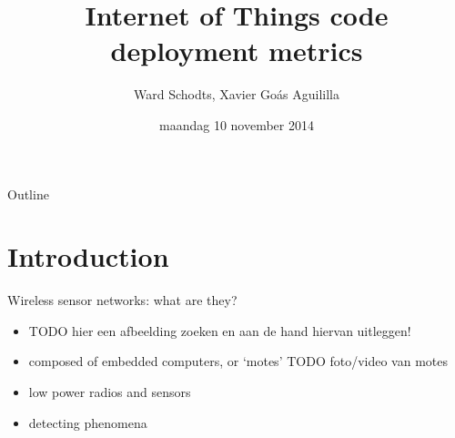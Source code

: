 \documentclass[presentation, bigger]{beamer}
\author{Ward Schodts, Xavier Goás Aguililla}
\date{maandag 10 november 2014}
\title{Internet of Things code deployment metrics}
\begin{document}
\maketitle
\begin{frame}{Outline}
\tableofcontents
\end{frame}


\section{Introduction}
\label{sec-1}
\begin{frame}[label=sec-1-1]{Wireless sensor networks: what are they?}
\begin{itemize}
\item TODO hier een afbeelding zoeken en aan de hand hiervan uitleggen!
\item composed of embedded computers, or ‘motes’
TODO foto/video van motes
\item low power radios and sensors
\item detecting phenomena
\end{itemize}
\end{frame}
\end{document}
